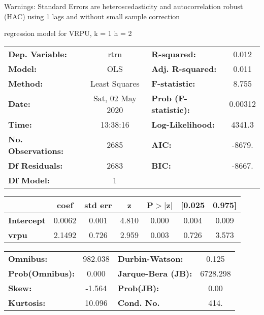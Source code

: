 Warnings: \newline
 [1] Standard Errors are heteroscedasticity and autocorrelation robust (HAC) using 1 lags and without small sample correction\ 

regression model for VRPU, k = 1 h = 2\begin{center}
\begin{tabular}{lclc}
\toprule
\textbf{Dep. Variable:}    &       rtrn       & \textbf{  R-squared:         } &     0.012   \\
\textbf{Model:}            &       OLS        & \textbf{  Adj. R-squared:    } &     0.011   \\
\textbf{Method:}           &  Least Squares   & \textbf{  F-statistic:       } &     8.755   \\
\textbf{Date:}             & Sat, 02 May 2020 & \textbf{  Prob (F-statistic):} &  0.00312    \\
\textbf{Time:}             &     13:38:16     & \textbf{  Log-Likelihood:    } &    4341.3   \\
\textbf{No. Observations:} &        2685      & \textbf{  AIC:               } &    -8679.   \\
\textbf{Df Residuals:}     &        2683      & \textbf{  BIC:               } &    -8667.   \\
\textbf{Df Model:}         &           1      & \textbf{                     } &             \\
\bottomrule
\end{tabular}
\begin{tabular}{lcccccc}
                   & \textbf{coef} & \textbf{std err} & \textbf{z} & \textbf{P$> |$z$|$} & \textbf{[0.025} & \textbf{0.975]}  \\
\midrule
\textbf{Intercept} &       0.0062  &        0.001     &     4.810  &         0.000        &        0.004    &        0.009     \\
\textbf{vrpu}      &       2.1492  &        0.726     &     2.959  &         0.003        &        0.726    &        3.573     \\
\bottomrule
\end{tabular}
\begin{tabular}{lclc}
\textbf{Omnibus:}       & 982.038 & \textbf{  Durbin-Watson:     } &    0.125  \\
\textbf{Prob(Omnibus):} &   0.000 & \textbf{  Jarque-Bera (JB):  } & 6728.298  \\
\textbf{Skew:}          &  -1.564 & \textbf{  Prob(JB):          } &     0.00  \\
\textbf{Kurtosis:}      &  10.096 & \textbf{  Cond. No.          } &     414.  \\
\bottomrule
\end{tabular}
\end{center}

